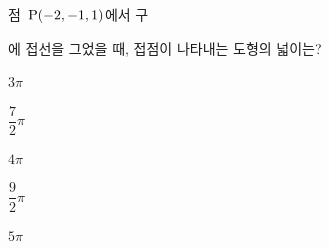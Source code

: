 점~$\mathrm{P}(-2{,}\mkern3mu\mathopen{}-1{,}\mkern3mu\mathopen{}1)$에서 구 \par\smallskip{}\par\smallskip\noindent 에 접선을 그었을 때, 접점이 나타내는 도형의 넓이는?
\begin{choices32}{\rule[-3ex]{0pt}{8ex}$3\pi$}{\rule[-3ex]{0pt}{8ex}$\dfrac{7}{2}\pi$}{\rule[-3ex]{0pt}{8ex}$4\pi$}{\rule[-3ex]{0pt}{8ex}$\dfrac{9}{2}\pi$}{\rule[-3ex]{0pt}{8ex}$5\pi$}\end{choices32}
